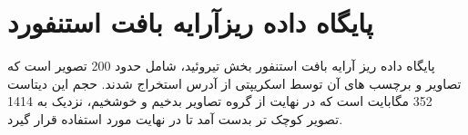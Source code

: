 \section{پایگاه داده ریزآرایه بافت استنفورد}\label{subsec:پایگاه-داده-ریزآرایه-بافت-استنفورد}
پایگاه داده ریز آرایه بافت استنفور\cite{marinelli2007stanford} بخش تیروئید، شامل حدود 200 تصویر است که تصاویر و برچسب های آن توسط اسکریپتی از آدرس \cite{stanfortissuemicroarray} استخراج شدند. حجم این دیتاست 352 مگابایت است که در نهایت از گروه تصاویر بدخیم و خوشخیم، نزدیک به 1414 تصویر کوچک تر بدست آمد تا در نهایت مورد استفاده قرار گیرد.

